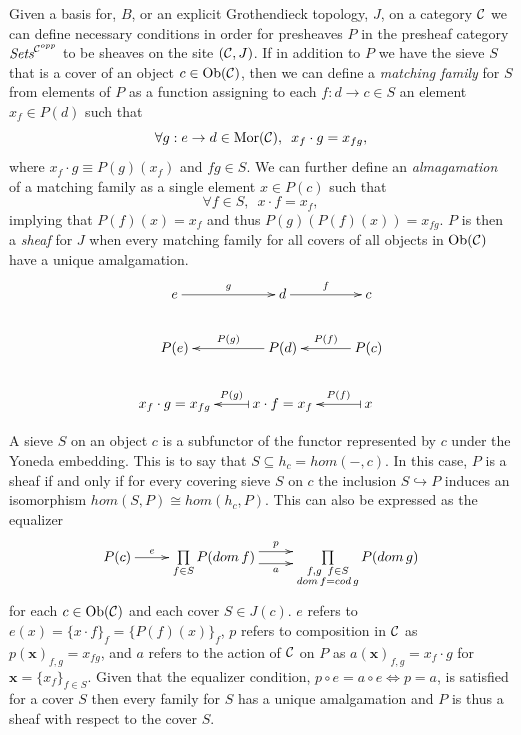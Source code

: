 \documentclass[aps,twocolumn]{revtex4-1}
\begin{document}
\iftoggle{thmsty}{
\begin{definition}
\label{definition-sheaves}
}{}
Given a basis for, $B$, or an explicit Grothendieck topology, $J$, on a category ${\mathcal C}$ we can define necessary conditions in order for presheaves $P$ in the presheaf category $\textit{Sets}^{{\mathcal C}^{opp}}$ to be sheaves on the site $({\mathcal C},J)$. If in addition to $P$ we have the sieve $S$ that is a cover of an object $c \in \mathop{\rm Ob}\nolimits({\mathcal C})$, then we can define a {\it matching family} for $S$ from elements of $P$ as a function assigning to each $f:d \rightarrow c \in S$ an element $x_f \in P(d)$ such that
$$
\forall g:e \rightarrow d \in \mathop{\rm Mor}\nolimits({\mathcal C}), \,\,\, x_f \cdot g = x_{fg},
$$
where $x_f \cdot g \equiv P(g)(x_f)$ and $fg \in S$. We can further define an {\it almagamation} of a matching family as a single element $x \in P(c)$ such that
$$
\forall f \in S, \,\,\, x \cdot f = x_f,
$$
implying that $P(f)(x)=x_f$ and thus $P(g)(P(f)(x))=x_{fg}$. $P$ is then a {\it sheaf} for $J$ when every matching family for all covers of all objects in $\mathop{\rm Ob}\nolimits({\mathcal C})$ have a unique amalgamation.
\begin{displaymath}
\xymatrix{
e \ar[r]^-{g} & d \ar[r]^-{f} & c\\
P(e) & P(d) \ar[l]_-{P(g)} & P(c) \ar[l]_-{P(f)}\\
x_f \cdot g = x_{fg} & x \cdot f = x_f \ar@{|->}[l]_-{P(g)} & x \ar@{|->}[l]_-{P(f)}
}
\end{displaymath}

A sieve $S$ on an object $c$ is a subfunctor of the functor represented by $c$ under the Yoneda embedding. This is to say that $S \subseteq h_c = hom(-,c)$. In this case, $P$ is a sheaf if and only if for every covering sieve $S$ on $c$ the inclusion $S \hookrightarrow P$ induces an isomorphism $hom(S,P) \cong hom(h_c,P)$. This can also be expressed as the equalizer
\begin{displaymath}
\xymatrix{
P(c) \ar[r]^-{e}
&
\prod\limits_{f \in S}
P(dom \, f)
\ar@<1ex>[r]^-{p} \ar@<-1ex>[r]_-{a}
&
\prod\limits_{\substack{f,g \,\,\, f \in S \\ dom \, f=cod \, g}}
P(dom \, g)
}
\end{displaymath}
\noindent for each $c \in \mathop{\rm Ob}\nolimits({\mathcal C})$ and each cover $S \in J(c)$. $e$ refers to $e(x)=\{x \cdot f\}_f = \{P(f)(x)\}_f$, $p$ refers to composition in ${\mathcal C}$ as $p( \mathbf{x} )_{f,g} = x_{fg}$, and $a$ refers to the action of ${\mathcal C}$ on $P$ as $a( \mathbf{x} )_{f,g} = x_f \cdot g$ for $\mathbf{x} = \{ x_f \}_{f \in S}$. Given that the equalizer condition, $p \circ e = a \circ e \Leftrightarrow p=a$, is satisfied for a cover $S$ then every family for $S$ has a unique amalgamation and $P$ is thus a sheaf with respect to the cover $S$.
\end{document}
